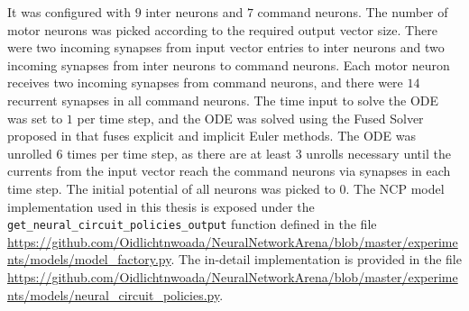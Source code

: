 \documentclass[draft,final]{vutinfth} %
\begin{document}
It was configured with $9$ inter neurons and $7$ command neurons. The number of motor neurons was picked according to the required output vector size.
There were two incoming synapses from input vector entries to inter neurons and two incoming synapses from inter neurons to command neurons.
Each motor neuron receives two incoming synapses from command neurons, and there were $14$ recurrent synapses in all command neurons.
The time input to solve the ODE was set to $1$ per time step, and the ODE was solved using the Fused Solver proposed in \cite{LTCNetworks} that fuses explicit and implicit Euler methods.
The ODE was unrolled $6$ times per time step, as there are at least $3$ unrolls necessary until the currents from the input vector reach the command neurons via synapses in each time step.
The initial potential of all neurons was picked to $0$.
The NCP model implementation used in this thesis is exposed under the \texttt{get\_neural\_circuit\_policies\_output} function defined in the file \url{https://github.com/Oidlichtnwoada/NeuralNetworkArena/blob/master/experiments/models/model_factory.py}.
The in-detail implementation is provided in the file \url{https://github.com/Oidlichtnwoada/NeuralNetworkArena/blob/master/experiments/models/neural_circuit_policies.py}.
\end{document}
